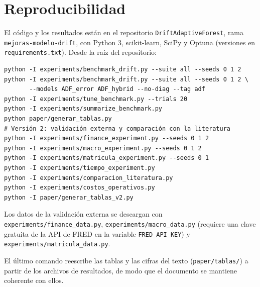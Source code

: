 \documentclass[11pt,a4paper]{article}
\begin{document}
\section{Reproducibilidad}\label{app:repro}

El código y los resultados están en el repositorio \texttt{DriftAdaptiveForest}, rama
\texttt{mejoras-modelo-drift}, con Python 3, scikit-learn, SciPy y Optuna (versiones en
\texttt{requirements.txt}). Desde la raíz del repositorio:

\begin{verbatim}
python -I experiments/benchmark_drift.py --suite all --seeds 0 1 2
python -I experiments/benchmark_drift.py --suite all --seeds 0 1 2 \
       --models ADF_error ADF_hybrid --no-diag --tag adf
python -I experiments/tune_benchmark.py --trials 20
python -I experiments/summarize_benchmark.py
python paper/generar_tablas.py
# Versión 2: validación externa y comparación con la literatura
python -I experiments/finance_experiment.py --seeds 0 1 2
python -I experiments/macro_experiment.py --seeds 0 1 2
python -I experiments/matricula_experiment.py --seeds 0 1
python -I experiments/tiempo_experiment.py
python -I experiments/comparacion_literatura.py
python -I experiments/costos_operativos.py
python -I paper/generar_tablas_v2.py
\end{verbatim}

Los datos de la validación externa se descargan con \texttt{experiments/finance\_data.py},
\texttt{experiments/macro\_data.py} (requiere una clave gratuita de la API de FRED en la variable
\texttt{FRED\_API\_KEY}) y \texttt{experiments/matricula\_data.py}.

El último comando reescribe las tablas y las cifras del texto (\texttt{paper/tablas/}) a partir de
los archivos de resultados, de modo que el documento se mantiene coherente con ellos.
\end{document}

